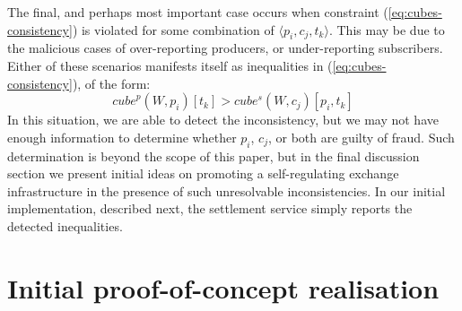 \documentclass[chi_draft]{sigchi}
\begin{document}
{The final, and perhaps most important case occurs when constraint (\ref{eq:cubes-consistency}) is violated for some combination of $\langle p_i, c_j, t_k \rangle$.
This may be due to the malicious cases of over-reporting producers, or under-reporting subscribers.
%
Either of these  scenarios manifests itself as inequalities in (\ref{eq:cubes-consistency}), of the form:
\begin{equation}\label{eq:inconsistencies}
\mathit{cube}^p(W, p_i)[t_k] > \mathit{cube^s}(W, c_j)[p_i, t_k]
\end{equation}
In this situation, we are able to detect the inconsistency, but we may not have enough information to determine whether $p_i$, $c_j$, or both are guilty of fraud.
Such determination is beyond the scope of this paper, but in the final discussion section we present initial ideas on promoting a self-regulating exchange infrastructure in the presence of such unresolvable inconsistencies.
%
In our initial implementation, described next, the settlement service simply reports the detected inequalities.

\section{Initial proof-of-concept realisation}  \label{eq:realisation}

%
%
%





}
\end{document}
